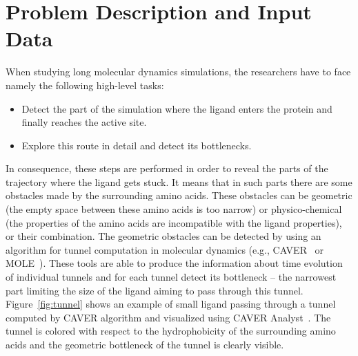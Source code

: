 \documentclass[twocolumn]{bmcart}%
\begin{document}
\section{Problem Description and Input Data}
When studying long molecular dynamics simulations, the researchers have to face namely the following high-level tasks:
\begin{itemize}
\item Detect the part of the simulation where the ligand enters the protein and finally reaches the active site.
\item Explore this route in detail and detect its bottlenecks.
\end{itemize}
In consequence, these steps are performed in order to reveal the parts of the trajectory where the ligand gets stuck.
It means that in such parts there are some obstacles made by the surrounding amino acids.
These obstacles can be geometric (the empty space between these amino acids is too narrow) or physico-chemical (the properties of the amino acids are incompatible with the ligand properties), or their combination.
The geometric obstacles can be detected by using an algorithm for tunnel computation in molecular dynamics (e.g., CAVER~\cite{Chovancova2012} or MOLE~\cite{Sehnal2013}).
These tools are able to produce the information about time evolution of individual tunnels and for each tunnel detect its bottleneck -- the narrowest part limiting the size of the ligand aiming to pass through this tunnel.
Figure~\ref{fig:tunnel} shows an example of small ligand passing through a tunnel computed by CAVER algorithm and visualized using CAVER Analyst~\cite{Kozlikova2014}. 
The tunnel is colored with respect to the hydrophobicity of the surrounding amino acids and the geometric bottleneck of the tunnel is clearly visible.
\end{document}
